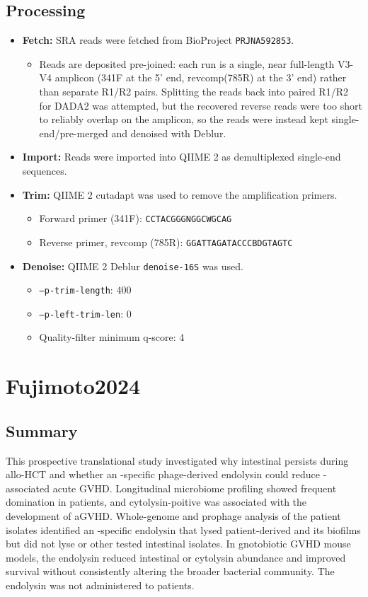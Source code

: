 \documentclass[11pt,a4paper]{article}
\begin{document}
\subsection{Processing}
\begin{itemize}
\item \textbf{Fetch:} SRA reads were fetched from BioProject \texttt{PRJNA592853}.
  \begin{itemize}
  \item Reads are deposited pre-joined: each run is a single, near full-length V3-V4 amplicon (341F at the 5' end, revcomp(785R) at the 3' end) rather than separate R1/R2 pairs. Splitting the reads back into paired R1/R2 for DADA2 was attempted, but the recovered reverse reads were too short to reliably overlap on the amplicon, so the reads were instead kept single-end/pre-merged and denoised with Deblur.
  \end{itemize}
\item \textbf{Import:} Reads were imported into QIIME 2 as demultiplexed single-end sequences.
\item \textbf{Trim:} QIIME 2 cutadapt was used to remove the amplification primers.
  \begin{itemize}
  \item Forward primer (341F): \texttt{CCTACGGGNGGCWGCAG}
  \item Reverse primer, revcomp (785R): \texttt{GGATTAGATACCCBDGTAGTC}
  \end{itemize}
\item \textbf{Denoise:} QIIME 2 Deblur \texttt{denoise-16S} was used.
  \begin{itemize}
  \item \texttt{--p-trim-length}: 400
  \item \texttt{--p-left-trim-len}: 0
  \item Quality-filter minimum q-score: 4
  \end{itemize}
\end{itemize}

\section{Fujimoto2024}
\subsection{Summary}
This prospective translational study investigated why intestinal \taxEnterococcusFaecalis persists during allo-HCT and whether an \taxEfaecalis-specific phage-derived endolysin could reduce \taxEfaecalis-associated acute GVHD. Longitudinal microbiome profiling showed frequent \taxEnterococcus domination in patients, and cytolysin-poitive  \taxEfaecalis was associated with the development of aGVHD. Whole-genome and prophage analysis of the patient isolates identified an \taxEfaecalis-specific endolysin that lysed patient-derived \taxEfaecalis and its biofilms but did not lyse \taxEfaecium or other tested intestinal isolates. In gnotobiotic GVHD mouse models, the endolysin reduced intestinal \taxEfaecalis or cytolysin abundance and improved survival without consistently altering the broader bacterial community. The endolysin was not administered to patients.
\end{document}
